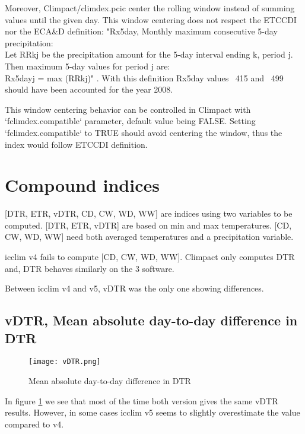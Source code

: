 \documentclass[a4paper,11pt]{article}
\begin{document}
        Moreover, Climpact/climdex.pcic center the rolling window instead of summing values until the given day. 
        This window centering does not respect the ETCCDI nor the ECA\&D definition:
        "Rx5day, Monthly maximum consecutive 5-day precipitation:\\
        Let RRkj be the precipitation amount for the 5-day interval ending k, period j. Then maximum 5-day values for period j are:\\
        Rx5dayj = max (RRkj)" \cite{doc/etccdi}.
        With this definition Rx5day values ~415 and ~499 should have been accounted for the year 2008.

        This window centering behavior can be controlled in Climpact with `fclimdex.compatible` parameter, default value being FALSE.
        Setting `fclimdex.compatible` to TRUE should avoid centering the window, thus the index would follow ETCCDI definition.
        

    \section{Compound indices}
        [DTR, ETR, vDTR, CD, CW, WD, WW] are indices using two variables to be computed.
        [DTR, ETR, vDTR] are based on min and max temperatures.
        [CD, CW, WD, WW] need both averaged temperatures and a precipitation variable.
        
        icclim v4 fails to compute [CD, CW, WD, WW].
        Climpact only computes DTR and, DTR behaves similarly on the 3 software. 

        Between icclim v4 and v5, vDTR was the only one showing differences.

        \subsection{vDTR, Mean absolute day-to-day difference in DTR}
            \begin{figure}[h]
                \centering
                \texttt{[image: vDTR.png]}
                \caption{Mean absolute day-to-day difference in DTR}
                \label{figure/vdtr}
            \end{figure}
            In figure \ref{figure/vdtr} we see that most of the time both version gives the same vDTR results.
            However, in some cases icclim v5 seems to slightly overestimate the value compared to v4.
\end{document}
